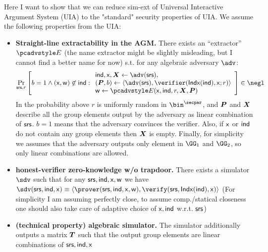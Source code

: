 \documentclass[runningheads,11pt]{llncs}
\let\spvec\vec
\let\vec\accentvec
\let\spvec\vec
\let\vec\spvec
\def\vec#1{\mathchoice{\mbox{\boldmath$\displaystyle#1$}}
  {\mbox{\boldmath$\textstyle#1$}} {\mbox{\boldmath$\scriptstyle#1$}}
  {\mbox{\boldmath$\scriptscriptstyle#1$}}}
\begin{document}
Here I want to show that we can reduce sim-ext of Universal Interactive Argument System
(UIA) to the "standard" security properties of UIA.
We assume the following properties from the UIA:
\begin{itemize}
	\item {\bf Straight-line extractability in the AGM.}
		There exists an ``extractor'' $\Ext$ (the name extractor might be slightly misleading, but I
		cannot find a better name for now) s.t. for any algebraic adversary $\adv$:
		\[
			\Prob[\srs,r]{
					b=1 \wedge (\inp,\wit)\not\in\ind:
					\begin{array}{l}
					\ind,\inp, \vec X \gets\adv(\srs),\\
					(\vec P,b) \gets \braket{\adv(\srs),\verifier(\Iphp(\ind),\inp;r)}\\
					\wit \gets \Ext(\inp,\ind,r,\vec X,\vec P)
					\end{array}
					}\in\negl
		\]
		In the probability above $r$ is uniformly random in $\bin^\secpar$, and $\vec P$ and
		$\vec X$	describe all the group elements output by the adversary as linear combination of
		$\mathsf{srs}$. $b=1$ means that the adversary convinces the verifier. Also, if $\mathsf{x}$ or ${\mathsf{ind}}$
		do not contain any group elements then $\vec X$ is	empty. Finally, for simplicity we assumes that the adversary outputs only element in
		$\GG_1$ and $\GG_2$, so only linear combinations are allowed.
	\item {\bf honest-verifier zero-knowledge w/o trapdoor.}
		There exists a simulator $\sdv$ such that for any $\mathsf{srs},{\mathsf{ind}},\mathsf{x},\mathsf{w}$ we have
		$\sdv(\srs,\ind,\inp)\equiv
		\braket{\prover(\srs,\ind,\inp,\wit),\verify(\srs,\Iphp(\ind),\inp)}$
		(For simplicity I am assuming perfectly close, to assume comp./statical closeness one should also
		take care of adaptive choice of $\mathsf{x},{\mathsf{ind}}$ w.r.t. $\mathsf{srs}$)

	\item {\bf (technical property) algebraic simulator.}
		The simulator additionally outputs a matrix $\vec T$ such that the output group elements
		are linear combinations of $\mathsf{srs},{\mathsf{ind}},\mathsf{x}$

\end{itemize}
\end{document}
